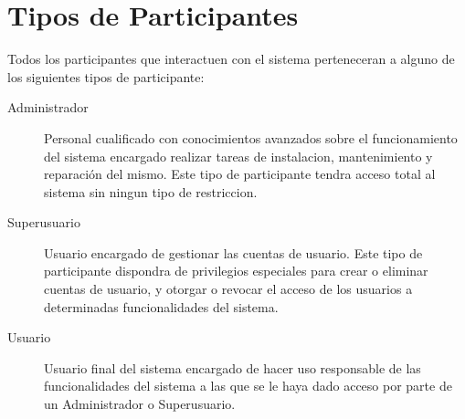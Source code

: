\chapter{Tipos de Participantes}

    Todos los participantes que interactuen con el sistema perteneceran a alguno de los siguientes tipos de participante:

    \begin{description}
        \item[Administrador] Personal cualificado con conocimientos avanzados sobre el funcionamiento del sistema encargado realizar tareas de instalacion, mantenimiento y reparación del mismo. Este tipo de participante tendra acceso total al sistema sin ningun tipo de restriccion.

        \item[Superusuario] Usuario encargado de gestionar las cuentas de usuario. Este tipo de participante dispondra de privilegios especiales para crear o eliminar cuentas de usuario, y otorgar o revocar el acceso de los usuarios a determinadas funcionalidades del sistema.

        \item[Usuario] Usuario final del sistema encargado de hacer uso responsable de las funcionalidades del sistema a las que se le haya dado acceso por parte de un Administrador o Superusuario.
    \end{description}
